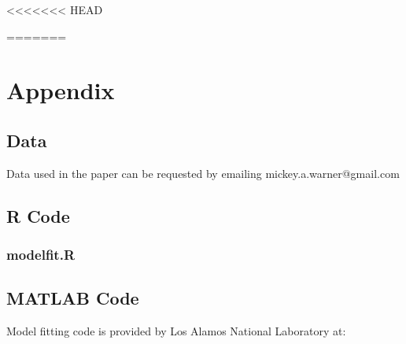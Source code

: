 \documentclass[12pt]{article}
\begin{document}




<<<<<<< HEAD
% 
% 
% 
% 
% 
% 
% 
% 

% 
% 
=======









\section*{Appendix}

\subsection*{Data}

Data used in the paper can be requested by emailing mickey.a.warner@gmail.com

\subsection*{R Code}
\begin{tiny}
\subsubsection*{modelfit.R}

\end{tiny}

\subsection*{MATLAB Code}
Model fitting code is provided by Los Alamos National Laboratory at:
\end{document}
